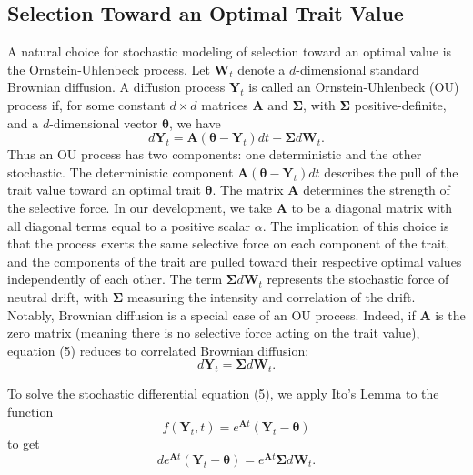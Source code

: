 \documentclass[12pt]{article}
\begin{document}
\subsection{Selection Toward an Optimal Trait Value}

A natural choice for stochastic modeling of selection toward an optimal value is the Ornstein-Uhlenbeck process.
Let $\textbf{W}_t$ denote a $d$-dimensional standard Brownian diffusion.  A diffusion process $\textbf{Y}_t$ is called an
Ornstein-Uhlenbeck (OU) process if, for some constant $d \times d$ matrices $\textbf{A}$ and $\boldsymbol \Sigma$, with $\boldsymbol \Sigma$
positive-definite, and a $d$-dimensional vector $\boldsymbol \theta$, we have
\begin{equation}
d \textbf{Y}_t = \textbf{A} (\boldsymbol \theta - \textbf{Y}_t) dt + \boldsymbol \Sigma d \textbf{W}_t.
\end{equation}
Thus an OU process has two components: one deterministic and the other stochastic.  The deterministic component
$\textbf{A} (\boldsymbol \theta - \textbf{Y}_t) dt$ describes the pull of the trait value toward an optimal trait $\boldsymbol \theta$.  The matrix $\textbf{A}$ determines
the strength of the selective force.  In our development, we take $\textbf{A}$ to be a diagonal matrix with all diagonal terms equal to a positive scalar  
$\alpha$.  The implication of this choice is that the process exerts the same selective force on each component of the trait, and the components
of the trait are pulled toward their respective optimal values independently of each other.
The term $\boldsymbol \Sigma d \textbf{W}_t$ represents the stochastic force of neutral drift, with $\boldsymbol \Sigma$ measuring the intensity and correlation 
of the drift.  Notably, Brownian diffusion is a special case of an OU process.  Indeed, if $\textbf{A}$ is the zero matrix (meaning there
is no selective force acting on the trait value), equation (5) reduces to correlated Brownian diffusion:
\begin{equation}
d \textbf{Y}_t = \boldsymbol \Sigma d \textbf{W}_t.
\end{equation}
\par
To solve the stochastic differential equation (5), we apply Ito's Lemma to the function
\begin{equation*}
f(\textbf{Y}_t,t) = e^{\textbf{A} t} ( \textbf{Y}_t - \boldsymbol \theta)
\end{equation*}
to get
\begin{equation*}
d e^{\textbf{A}t} ( \textbf{Y}_t - \boldsymbol \theta) = e^{\textbf{A}t} \boldsymbol \Sigma d \textbf{W}_t .
\end{equation*}
\end{document}
